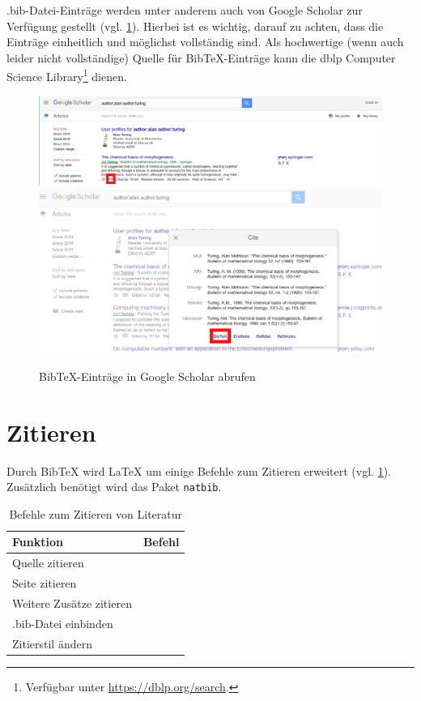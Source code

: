 .bib-Datei-Einträge werden unter anderem auch von Google Scholar zur Verfügung gestellt (vgl. \cref{fig:google-scholar-bibtex}).
Hierbei ist es wichtig, darauf zu achten, dass die Einträge einheitlich und möglichst vollständig sind.
Als hochwertige (wenn auch leider nicht vollständige) Quelle für Bib\TeX-Einträge kann die dblp Computer Science Library\footnote{Verfügbar unter \url{https://dblp.org/search}.} dienen.

\begin{figure}[H]
  \includegraphics[width=\textwidth]{graphics/google_bibtex1.jpg}  
  \includegraphics[width=\textwidth]{graphics/google_bibtex2.jpg}  
  \caption{Bib\TeX-Einträge in Google Scholar abrufen}
  \label{fig:google-scholar-bibtex}
\end{figure}

\section{Zitieren}
Durch Bib\TeX{} wird \LaTeX{} um einige Befehle zum Zitieren erweitert (vgl. \cref{tbl:bibtex-commands}). 
Zusätzlich benötigt wird das Paket \texttt{natbib}.

\begin{table}[H]
  \centering
  \begin{tabular}{ll}
  \toprule
  Funktion                 & Befehl \\ \midrule
  Quelle zitieren          & \texttt{\cite{<quelle>}} \\
  Seite zitieren           & \texttt{\cite[S. 15]{<quelle>}} \\
  Weitere Zusätze zitieren & \texttt{\cite[<präfix>][<suffix>]{<quelle>}} \\
  .bib-Datei einbinden     & \texttt{} \\
  Zitierstil ändern        & \texttt{} \\ \bottomrule
  \end{tabular}
  \caption{Befehle zum Zitieren von Literatur}
  \label{tbl:bibtex-commands}
\end{table}

